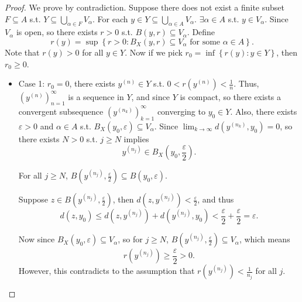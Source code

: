 \begin{proof}
    We prove by contradiction. Suppose there does not exist a finite subset \(F \subseteq A\) s.t. \(Y \subseteq \bigcup_{\alpha \in F} V_\alpha  \).  
        For each \(y \in Y \subseteq \bigcup_{\alpha \in A} V_\alpha  \). \(\exists \alpha \in A\) s.t. \(y \in V_\alpha \). Since \(V_\alpha \) is open, so there exists \(r > 0\) s.t. \(B(y, r) \subseteq V_\alpha \). Define 
        \[
            r(y) = \sup \left\{ r > 0 : B_X(y, r) \subseteq V_\alpha \text{ for some } \alpha \in A \right\}. 
        \] Note that \(r(y) > 0\) for all \(y \in Y\). Now if we pick \(r_0 = \inf \left\{ r(y) : y\in Y \right\} \), then \(r_0 \ge 0\). 
        \begin{itemize}
            \item Case 1: \(r_0 = 0\), there exists \(y^{(n)} \in Y\) s.t. \( 0 < r\left( y^{(n)} \right) < \frac{1}{n} \). Thus, \(\left( y^{(n)} \right)_{n=1}^{\infty}  \) is a sequence in \(Y\), and since \(Y\) is compact, so there exists a convergent subsequence \(\left( y^{(n_k)} \right)_{k=1}^{\infty}  \) converging to \(y_0 \in Y\). Also, there exists \(\varepsilon > 0\) and \(\alpha \in A\) s.t. \(B_X(y_0, \varepsilon ) \subseteq V_\alpha \). Since \(\lim_{k \to \infty} d\left( y^{(n_k)}, y_0 \right) = 0  \), so there exists \(N > 0\) s.t. \(j \ge N\) implies 
            \[
                y^{(n_j)} \in B_X \left( y_0, \frac{\varepsilon}{2} \right).
            \]
            \begin{claim}
                For all \(j \ge N\), \(B\left( y^{(n_j)}, \frac{\varepsilon}{2} \right) \subseteq B\left( y_0, \varepsilon  \right)  \). 
            \end{claim}
            \begin{explanation}
                Suppose \(z \in B\left( y^{(n_j)}, \frac{\varepsilon}{2}  \right) \), then \(d\left( z, y^{(n_j)} \right) < \frac{\varepsilon}{2}\), and thus 
                \[
                    d(z, y_0) \le d\left( z, y^{(n_j)} \right) + d\left( y^{(n_j)}, y_0 \right) < \frac{\varepsilon}{2} + \frac{\varepsilon}{2} = \varepsilon.  
                \]   
            \end{explanation}
            Now since \(B_X(y_0, \varepsilon ) \subseteq V_\alpha \), so for \(j \ge N\), \(B\left( y^{(n_j)}, \frac{\varepsilon}{2} \right) \subseteq V_\alpha \), which means
            \[
                r\left( y^{(n_j)} \right) \ge \frac{\varepsilon}{2} > 0.
            \]    
            However, this contradicts to the assumption that \(r\left( y^{(n_j)} \right) < \frac{1}{n_j} \) for all \(j\).

\end{itemize}
\end{proof}
